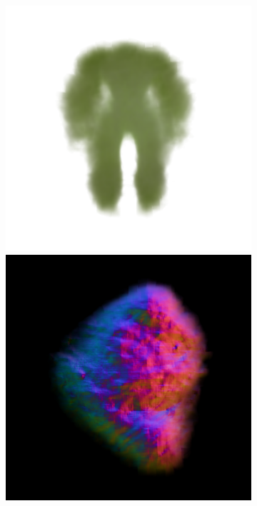 \begin{figure}[ht]
\begin{subfigure}[b]{0.222\textwidth}
        \includegraphics[width=\textwidth]{etc/a robot made out of plants/magic123/magic123_coarse_robot_back_0_part1.png}
        \includegraphics[width=\textwidth]{etc/a robot made out of plants/magic123/magic123_coarse_robot_left_0_part2.png}

\end{subfigure}
\end{figure}
